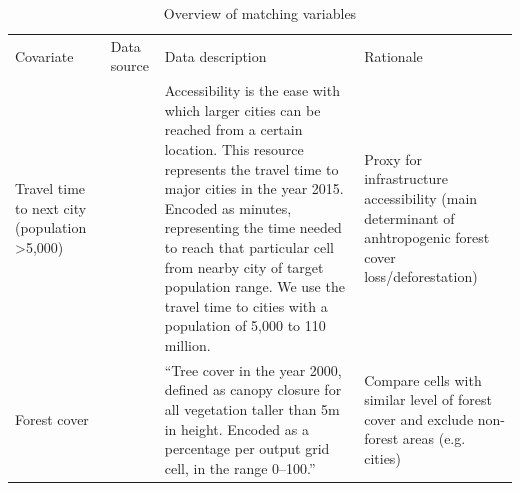 \documentclass{article}
\begin{document}
\newpage
\begin{table}[h]
\caption{Overview of matching variables}
\label{tab:matchvar}
\begin{tabular}{L{2cm}L{2cm}L{9cm}L{3cm}}
\toprule
Covariate  & Data source & Data description  & Rationale \\
Travel time to next city (population >5,000)                           & \cite{weiss2018global}                         & Accessibility is the ease with which larger cities can be reached from a certain location. This resource represents the travel time to major cities in the year 2015. Encoded as minutes, representing the time needed to reach that particular cell from nearby city of target population range. We use the travel time to cities with a population of 5,000 to 110 million.                                                   & Proxy for infrastructure accessibility (main determinant of anhtropogenic forest cover loss/deforestation) \\
Forest cover                                                           & \cite{hansen2013high}                         & ``Tree cover in the year 2000, defined as canopy closure for all vegetation taller than 5m in height. Encoded as a percentage per output grid cell, in the range 0–100.''                                                                                                                                                                                                                                                         & Compare cells with similar level of forest cover and exclude non-forest areas (e.g. cities)  \\


\end{tabular}
\end{table}
\end{document}

